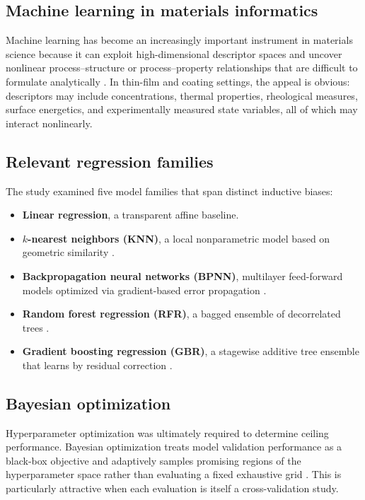 \documentclass[11pt]{article}
\begin{document}
\subsection{Machine learning in materials informatics}
Machine learning has become an increasingly important instrument in materials science because it can exploit high-dimensional descriptor spaces and uncover nonlinear process--structure or process--property relationships that are difficult to formulate analytically \cite{schmidt2019,kailkhura2019}. In thin-film and coating settings, the appeal is obvious: descriptors may include concentrations, thermal properties, rheological measures, surface energetics, and experimentally measured state variables, all of which may interact nonlinearly.

\subsection{Relevant regression families}
The study examined five model families that span distinct inductive biases:
\begin{itemize}
    \item \textbf{Linear regression}, a transparent affine baseline.
    \item \textbf{$k$-nearest neighbors (KNN)}, a local nonparametric model based on geometric similarity \cite{aha1991}.
    \item \textbf{Backpropagation neural networks (BPNN)}, multilayer feed-forward models optimized via gradient-based error propagation \cite{rumelhart1986}.
    \item \textbf{Random forest regression (RFR)}, a bagged ensemble of decorrelated trees \cite{breiman2001}.
    \item \textbf{Gradient boosting regression (GBR)}, a stagewise additive tree ensemble that learns by residual correction \cite{friedman2001}.
\end{itemize}

\subsection{Bayesian optimization}
Hyperparameter optimization was ultimately required to determine ceiling performance. Bayesian optimization treats model validation performance as a black-box objective and adaptively samples promising regions of the hyperparameter space rather than evaluating a fixed exhaustive grid \cite{snoek2012}. This is particularly attractive when each evaluation is itself a cross-validation study.
\end{document}
